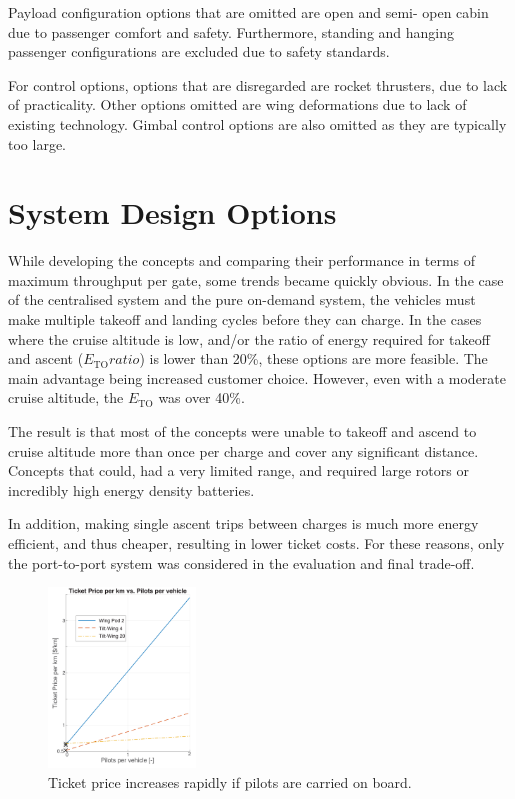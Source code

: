 Payload configuration options that are omitted are open and semi- open cabin due to passenger comfort and safety. Furthermore, standing and hanging passenger configurations are excluded due to safety standards.

For control options, options that are disregarded are rocket thrusters, due to lack of practicality. Other options omitted are wing deformations due to lack of existing technology. Gimbal control options are also omitted as they are typically too large. 

\section{System Design Options}
While developing the concepts and comparing their performance in terms of maximum throughput per gate, some trends became quickly obvious. In the case of the centralised system and the pure on-demand system, the vehicles must make multiple takeoff and landing cycles before they can charge. In the cases where the cruise altitude is low, and/or the ratio of energy required for takeoff and ascent ($E_\text{TO} ratio$) is lower than 20\%, these options are more feasible. The main advantage being increased customer choice. However, even with a moderate cruise altitude, the $E_\text{TO}$ was over 40\%.

The result is that most of the concepts were unable to takeoff and ascend to cruise altitude more than once per charge and cover any significant distance. Concepts that could, had a very limited range, and required large rotors or incredibly high energy density batteries.

In addition, making single ascent trips between charges is much more energy efficient, and thus cheaper, resulting in lower ticket costs. For these reasons, only the port-to-port system was considered in the evaluation and final trade-off.

\begin{figure}
    \centering
    \includegraphics[width=0.35\textwidth]{Figures/Pilots_TPrice_perkm.png}
    \captionsetup{justification=centering}
    \caption{Ticket price increases rapidly if pilots are carried on board.}
    \label{fig:pilotedcost}
\end{figure}

